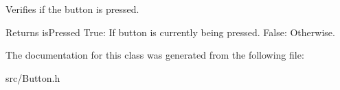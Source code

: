 Verifies if the button is pressed. 

\begin{DoxyReturn}{Returns}
is\+Pressed True\+: If button is currently being pressed. False\+: Otherwise. 
\end{DoxyReturn}


The documentation for this class was generated from the following file\+:\begin{DoxyCompactItemize}
\item 
src/Button.\+h\end{DoxyCompactItemize}
